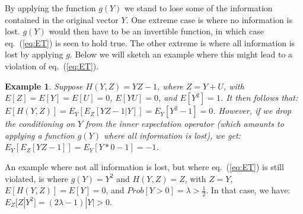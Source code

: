 \documentclass[12pt, a4paper]{article}
\newtheorem{example}[theorem]{Example}
\begin{document}
By applying the function $g(Y)$ we stand to lose some of the information contained in the original vector $Y$. One extreme case is where no information is lost. $g(Y)$ would then have to be an invertible function, in which case eq.~(\ref{eq:ET}) is seen to hold true. The other extreme is where all information is lost by applying $g$. Below we will sketch an example where this might lead to a violation of eq.~(\ref{eq:ET}).
\begin{example}
Suppose $H(Y,Z)=YZ-1$, where $Z=Y+U$, with $E[Z]=E[Y]=E[U]=0$, $E[YU]=0$, and $E[Y^2]=1$. It then follows that: $E[H(Y,Z)]=E_Y[E_Z[YZ-1|Y]]=E_Y[Y^2-1]=0$. However, if we drop the conditioning on $Y$ from the inner expectation operator (which amounts to applying a function $g(Y)$ where all information is lost), we get: $E_Y[E_Z[YZ-1]]=E_Y[Y*0-1]=-1$.
\end{example}
An example where not all information is lost, but where eq.~(\ref{eq:ET}) is still violated, is where $g(Y)=Y^2$ and $H(Y,Z)=Z$, with $Z=Y$, $E[H(Y,Z)]=E[Y]=0$, and $Prob[Y>0]=\lambda >\frac{1}{2}$. In that case, we have: $E_Z[Z|Y^2]=(2\lambda-1)|Y| >0$.
\end{document}
